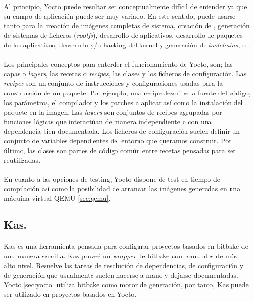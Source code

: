 \paragraph{}Al principio, Yocto puede resultar ser conceptualmente difícil de entender
ya que su campo de aplicación puede ser muy variado. En este sentido, puede usarse tanto para
la creación de imágenes completas de sistema, creación de \emph{}, generación
de sistemas de ficheros (\emph{rootfs}), desarrollo de aplicativos, desarrollo de paquetes
de los aplicativos, desarrollo y/o hacking del kernel y generación de  \emph{toolchains},
 o .

\paragraph{\label{layers} \label{recipes}}Los principales conceptos para enterder el
funcionamiento de Yocto, son;
las capas o \emph{layers}, las recetas o \emph{recipes}, las clases y los ficheros de
configuración. Las \emph{recipes} son un conjunto de instrucciones y configuraciones
usadas para la construcción de un paquete. Por ejemplo, una recipe describe la fuente
del código, los parámetros, el compilador y los parches a aplicar así como la instalación
del paquete en la imagen. Las \emph{layers} son conjuntos de recipes agrupadas por
funciones lógicas que interactúan de manera independiente o con una dependencia bien
documentada. Los ficheros de configuración suelen definir un conjunto de variables
dependientes del entorno que queramos construir. Por último, las clases son partes de
código común entre recetas pensadas para ser reutilizadas.

\paragraph{}En cuanto a las opciones de testing, Yocto dispone de test en tiempo
de compilación así como la posibilidad de arrancar las imágenes generadas en una máquina
virtual QEMU \ref{sec:qemu}.

\subsection{Kas.}\label{sec:kas}

\paragraph{}Kas es una herramienta pensada para configurar proyectos basados en bitbake
de una manera sencilla. Kas proveé un \emph{wrapper} de bitbake con comandos de más alto
nivel. Resuelve las tareas de resolución de dependencias, de configuración y de
generación que usualmente suelen hacerse a mano y dejarse documentadas. Yocto
\ref{sec:yocto} utiliza bitbake como motor de generación, por tanto, Kas puede ser
utilizado en proyectos basados en Yocto.
\cite{kas}

